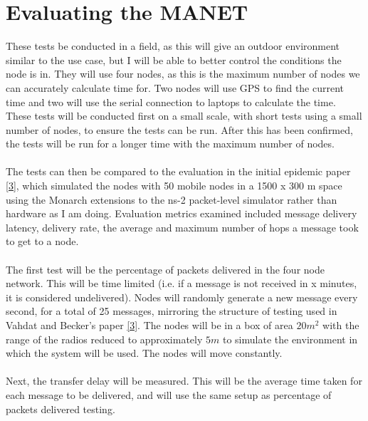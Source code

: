 \documentclass[10pt, a4paper]{article}
\begin{document}
\section*{Evaluating the MANET}
These tests be conducted in a field, as this will give an outdoor environment similar to the use case, but I will be able to better control the conditions the node is in. They will use four nodes, as this is the maximum number of nodes we can accurately calculate time for. Two nodes will use GPS to find the current time and two will use the serial connection to laptops to calculate the time. These tests will be conducted first on a small scale, with short tests using a small number of nodes, to ensure the tests can be run. After this has been confirmed, the tests will be run for a longer time with the maximum number of nodes. \\  \\
The tests can then be compared to the evaluation in the initial epidemic paper \hyperref[epidemic]{[3]}, which simulated the nodes with 50 mobile nodes in a 1500 x 300 m space using the Monarch extensions to the ns-2 packet-level simulator rather than hardware as I am doing. Evaluation metrics examined included message delivery latency, delivery rate, the average and maximum number of hops a message took to get to a node.\\ \\
The first test will be the percentage of packets delivered in the four node network. This will be time limited (i.e. if a message is not received in x minutes, it is considered undelivered). Nodes will randomly generate a new message every second, for a total of 25 messages, mirroring the structure of testing used in Vahdat and Becker's paper \hyperref[epidemic]{[3]}. The nodes will be in a box of area $20m^2$ with the range of the radios reduced to approximately $5m$ to simulate the environment in which the system will be used. The nodes will move constantly. \\  \\ 
Next, the transfer delay will be measured. This will be the average time taken for each message to be delivered, and will use the same setup as percentage of packets delivered testing. \\ \\
\end{document}
